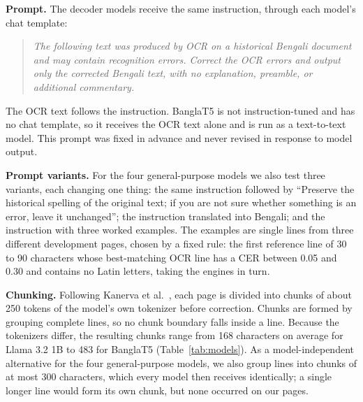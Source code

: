 \documentclass[conference]{IEEEtran}
\begin{document}
\textbf{Prompt.} The decoder models receive the same instruction, through each model's chat template:
\begin{quote}
\small\itshape
The following text was produced by OCR on a historical Bengali document and may contain recognition errors. Correct the OCR errors and output only the corrected Bengali text, with no explanation, preamble, or additional commentary.
\end{quote}
The OCR text follows the instruction. BanglaT5 is not instruction-tuned and has no chat template, so it receives the OCR text alone and is run as a text-to-text model. This prompt was fixed in advance and never revised in response to model output.

\textbf{Prompt variants.} For the four general-purpose models we also test three variants, each changing one thing: the same instruction followed by ``Preserve the historical spelling of the original text; if you are not sure whether something is an error, leave it unchanged''; the instruction translated into Bengali; and the instruction with three worked examples. The examples are single lines from three different development pages, chosen by a fixed rule: the first reference line of 30 to 90 characters whose best-matching OCR line has a CER between 0.05 and 0.30 and contains no Latin letters, taking the engines in turn.

\textbf{Chunking.} Following Kanerva et al.~\cite{kanerva2025nofreelunches}, each page is divided into chunks of about 250 tokens of the model's own tokenizer before correction. Chunks are formed by grouping complete lines, so no chunk boundary falls inside a line. Because the tokenizers differ, the resulting chunks range from 168 characters on average for Llama 3.2 1B to 483 for BanglaT5 (Table~\ref{tab:models}). As a model-independent alternative for the four general-purpose models, we also group lines into chunks of at most 300 characters, which every model then receives identically; a single longer line would form its own chunk, but none occurred on our pages.
\end{document}

